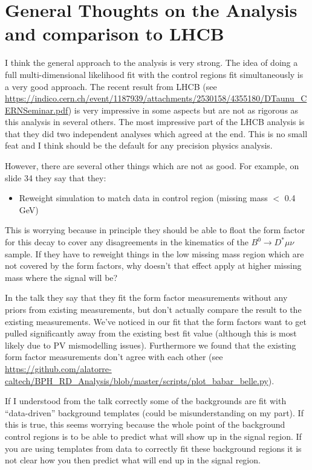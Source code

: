 \documentclass[12pt]{report}
\begin{document}
\section{General Thoughts on the Analysis and comparison to LHCB}
I think the general approach to the analysis is very strong. The idea of doing
a full multi-dimensional likelihood fit with the control regions fit
simultaneously is a very good approach. The recent result from LHCB (see
\url{https://indico.cern.ch/event/1187939/attachments/2530158/4355180/DTaunu_CERNSeminar.pdf})
is very impressive in some aspects but are not as rigorous as this analysis in
several others. The most impressive part of the LHCB analysis is that they did
two independent analyses which agreed at the end. This is no small feat and I
think should be the default for any precision physics analysis.

However, there are several other things which are not as good. For example, on
slide 34 they say that they:
\begin{itemize}
\item Reweight simulation to match data in control region (missing mass $<$ 0.4 GeV)
\end{itemize}
This is worrying because in principle they should be able to float the form
factor for this decay to cover any disagreements in the kinematics of the $B^0
\rightarrow D^* \mu \nu$ sample. If they have to reweight things in the low
missing mass region which are not covered by the form factors, why doesn't that
effect apply at higher missing mass where the signal will be?

In the talk they say that they fit the form factor measurements without any
priors from existing measurements, but don't actually compare the result to the
existing measurements. We've noticed in our fit that the form
factors want to get pulled significantly away from the existing best fit value
(although this is most likely due to PV mismodelling issues). Furthermore we
found that the existing form factor measurements don't agree with each other
(see
\url{https://github.com/alatorre-caltech/BPH_RD_Analysis/blob/master/scripts/plot_babar_belle.py}).

If I understood from the talk correctly some of the backgrounds are fit with
``data-driven'' background templates (could be misunderstanding on my part). If
this is true, this seems worrying because the whole point of the background
control regions is to be able to predict what will show up in the signal
region. If you are using templates from data to correctly fit these background
regions it is not clear how you then predict what will end up in the signal
region.
\end{document}

